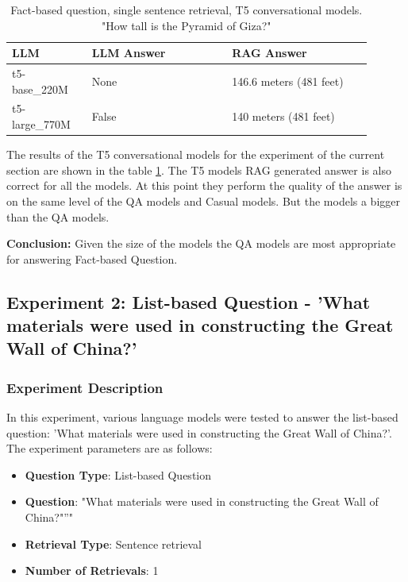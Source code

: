 \documentclass{wseas}
\begin{document}
\begin{table}[htbp]
  \centering
  \caption{Fact-based question, single sentence retrieval, T5 conversational models. "How tall is the Pyramid of Giza?"} %
  \label{tab:experiment_R_1_sentence_Q_fact_M_T5_table}  %
  \begin{tabular}{|p{0.2\linewidth}|p{0.35\linewidth}|p{0.35\linewidth}|}
    \hline
    \textbf{LLM} & \textbf{LLM Answer} & \textbf{RAG Answer} \\ \hline
    t5-base\_220M & None & 146.6 meters (481 feet) \\ \hline
    t5-large\_770M & False & 140 meters (481 feet) \\ \hline
  \end{tabular}
\end{table}
The results of the T5 conversational models for the experiment of the 
current section are shown in the table \ref{tab:experiment_R_1_sentence_Q_fact_M_T5_table}.
The T5 models RAG generated answer is also correct for all the models.
At this point they perform the quality of the answer is on the same
level of the QA models and Casual models. But the models a bigger than
the QA models.

\textbf{Conclusion:}
Given the size of the models the QA models are most
appropriate for answering Fact-based Question.


\subsection{Experiment 2: List-based Question - 'What materials were
used in constructing the Great Wall of China?'}

\subsubsection{Experiment Description}

In this experiment, various language models were tested to answer the
list-based question: 'What materials were used in constructing the
Great Wall of China?'. The experiment parameters are as follows:

\begin{itemize}
\item
  \textbf{Question Type}: List-based Question
\item
  \textbf{Question}: "What materials were used in constructing the Great Wall of China?"''"
\item
  \textbf{Retrieval Type}: Sentence retrieval
\item
  \textbf{Number of Retrievals}: 1
\end{itemize}
\end{document}
